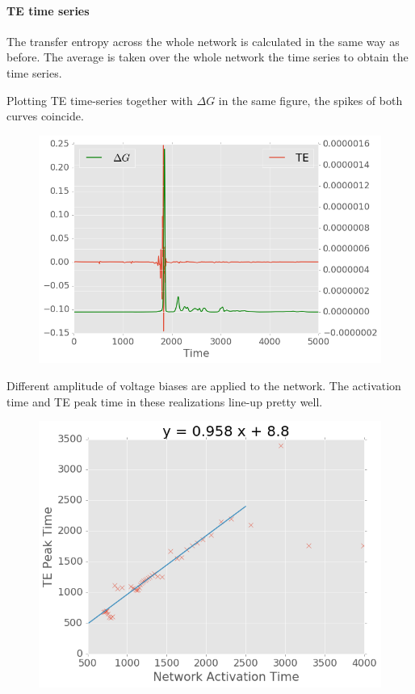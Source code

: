 \documentclass[%
 reprint,
 amsmath,amssymb,
 aps,
]{revtex4-2}
\begin{document}
\paragraph{TE time series}

The transfer entropy across the whole network is calculated in the same way as before. The average is taken over the whole network the time series to obtain the time series.

Plotting TE time-series together with $\Delta G$ in the same figure, the spikes of both curves coincide.

\begin{figure}[h]
	\centering
	\includegraphics[width=1\linewidth]{figure/TE_dG}
	\caption{}
	\label{fig:te_dg}
\end{figure}

Different amplitude of voltage biases are applied to the network. The activation time and TE peak time in these realizations line-up pretty well.

\begin{figure}[h]
	\centering
	\includegraphics[width=1\linewidth]{figure/TE_act_time}
	\caption{}
	\label{fig:te_act_time}
\end{figure}
\end{document}

